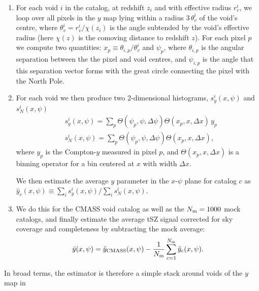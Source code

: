 \documentclass[twocolumn,amsfont,amssymb,amsmath, showpacs,balancelastpage, nofootinbib]{revtex4-1}
\begin{document}
      \begin{enumerate}
        \item For each void $i$ in the catalog, at redshift $z_i$ and with effective radius
              $r^i_v$, we loop over all pixels in the $y$ map lying within a radius
              $3\,\theta^i_v$ of the void's centre, where $\theta^i_v=r^i_v/\chi(z_i)$ is
              the angle subtended by the void's effective radius (here $\chi(z)$ is the
              comoving distance to redshift $z$). For each pixel $p$ we compute two
              quantities: $x_p\equiv \theta_{i,p}/\theta^i_v$ and $\psi_{p}$, where
              $\theta_{i,p}$ is the angular separation between the the pixel and void centres,
              and $\psi_{i,p}$ is the angle that this separation vector forms with the great
              circle connecting the pixel with the North Pole.
        \item For each void we then produce two 2-dimensional histograms, $s^i_y(x,\psi)$ and
              $s^i_N(x,\psi)$
              \begin{align}\nonumber
                &s^i_y(x,\psi)=\sum_p \Theta(\psi_p,\psi,\Delta\psi)\Theta(x_p,x,\Delta x)\,y_p
                \\\nonumber
                &s^i_N(x,\psi)=\sum_p \Theta(\psi_p,\psi,\Delta\psi)\Theta(x_p,x,\Delta x),
              \end{align}
              where $y_p$ is the Compton-$y$ measured in pixel $p$, and $\Theta(x_p,x,\Delta x)$
              is a binning operator for a bin centered at $x$ with width $\Delta x$.
              
              We then estimate the average $y$ parameter in the $x$-$\psi$ plane for catalog $c$
              as $\hat{y}_c(x,\psi)\equiv\sum_i s^i_y(x,\psi)/\sum_i s^i_N(x,\psi)$.
        \item We do this for the CMASS void catalog as well as the $N_{\rm m}=1000$ mock
              catalogs, and finally estimate the average tSZ signal corrected for sky coverage
              and completeness by subtracting the mock average:
              \begin{equation}\label{eq:stack_estimator}
                \bar{y}(x,\psi)=\hat{y}_{\rm CMASS}(x,\psi)-
                \frac{1}{N_{\rm m}}\sum_{c=1}^{N_{\rm m}}\hat{y}_c(x,\psi).
              \end{equation}
      \end{enumerate}
      In broad terms, the estimator is therefore a simple stack around voids of the $y$ map in
\end{document}

